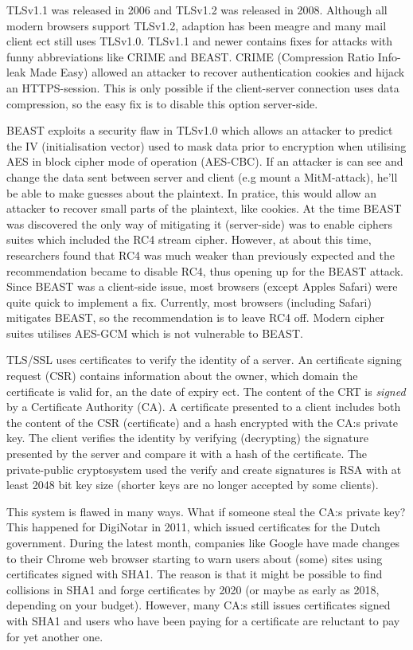 \documentclass[11pt,twoside]{article}
\makeatletter
\newcounter{problem}
\renewcommand\theproblem{\arabic{problem}}
\newenvironment{problem}{%
  \bigbreak
  \refstepcounter{problem}\noindent
  \llap{\textbf{\theproblem}\quad}\ignorespaces
}{%
  \par\if@nadaten@solutions\relax\else\filbreak\fi
}
\makeatother
\begin{document}
\begin{problem}
  TLSv1.1 was released in 2006 and TLSv1.2 was released in 2008. Although all modern browsers support TLSv1.2, adaption has been meagre and many mail client ect still uses TLSv1.0. TLSv1.1 and newer contains fixes for attacks with funny abbreviations like CRIME and BEAST. CRIME (Compression Ratio Info-leak Made Easy) allowed an attacker to recover authentication cookies and hijack an HTTPS-session. This is only possible if the client-server connection uses data compression, so the easy fix is to disable this option server-side. 
  
  BEAST exploits a security flaw in TLSv1.0 which allows an attacker to predict the IV (initialisation vector) used to mask data prior to encryption when utilising AES in block cipher mode of operation (AES-CBC). If an attacker is can see and change the data sent between server and client (e.g mount a MitM-attack), he'll be able to make guesses about the plaintext. In pratice, this would allow an attacker to recover small parts of the plaintext, like cookies. At the time BEAST was discovered the only way of mitigating it (server-side) was to enable ciphers suites which included the RC4 stream cipher. However, at about this time, researchers found that RC4 was much weaker than previously expected and the recommendation became to disable RC4, thus opening up for the BEAST attack. Since BEAST was a client-side issue, most browsers (except Apples Safari) were quite quick to implement a fix. Currently, most browsers (including Safari) mitigates BEAST, so the recommendation is to leave RC4 off. Modern cipher suites utilises AES-GCM which is not vulnerable to BEAST.
  
  TLS/SSL uses certificates to verify the identity of a server. An certificate signing request (CSR) contains information about the owner, which domain the certificate is valid for, an the date of expiry ect. The content of the CRT is \textit{signed} by a Certificate Authority (CA). A certificate presented to a client includes both the content of the CSR (certificate) and a hash encrypted with the CA:s private key. The client verifies the identity by verifying (decrypting) the signature presented by the server and compare it with a hash of the certificate. The private-public cryptosystem used the verify and create signatures is RSA with at least 2048 bit key size (shorter keys are no longer accepted by some clients). 
  
  This system is flawed in many ways. What if someone steal the CA:s private key? This happened for DigiNotar in 2011, which issued certificates for the Dutch government. During the latest month, companies like Google have made changes to their Chrome web browser starting to warn users about (some) sites using certificates signed with SHA1. The reason is that it might be possible to find collisions in SHA1 and forge certificates by 2020 (or maybe as early as 2018, depending on your budget). However, many CA:s still issues certificates signed with SHA1 and users who have been paying for a certificate are reluctant to pay for yet another one.
\end{problem}
\end{document}
